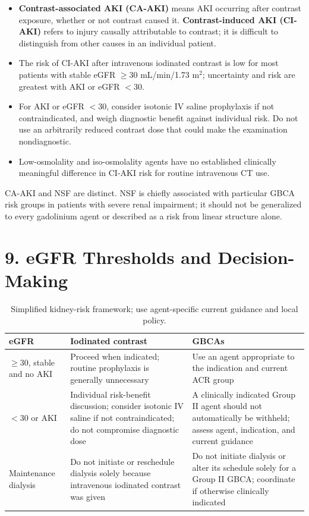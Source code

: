 \begin{itemize}
    \item \textbf{Contrast-associated AKI (CA-AKI)} means AKI occurring after contrast exposure, whether or not contrast caused it. \textbf{Contrast-induced AKI (CI-AKI)} refers to injury causally attributable to contrast; it is difficult to distinguish from other causes in an individual patient.
    \item The risk of CI-AKI after intravenous iodinated contrast is low for most patients with stable eGFR $\geq30$ mL/min/1.73 m$^2$; uncertainty and risk are greatest with AKI or eGFR $<30$.
    \item For AKI or eGFR $<30$, consider isotonic IV saline prophylaxis if not contraindicated, and weigh diagnostic benefit against individual risk. Do not use an arbitrarily reduced contrast dose that could make the examination nondiagnostic.
    \item Low-osmolality and iso-osmolality agents have no established clinically meaningful difference in CI-AKI risk for routine intravenous CT use.
\end{itemize}

\begin{pearlbox}
CA-AKI and NSF are distinct. NSF is chiefly associated with particular GBCA risk groups in patients with severe renal impairment; it should not be generalized to every gadolinium agent or described as a risk from linear structure alone.
\end{pearlbox}


\section*{9. eGFR Thresholds and Decision-Making}

\begin{table}[h]
\centering
\caption{Simplified kidney-risk framework; use agent-specific current guidance and local policy.}
\begin{tabular}{|p{}|p{}|p{}|}
\hline
\textbf{eGFR} & \textbf{Iodinated contrast} & \textbf{GBCAs} \\
\hline
$\geq$30, stable and no AKI & Proceed when indicated; routine prophylaxis is generally unnecessary & Use an agent appropriate to the indication and current ACR group \\
\hline
$<$30 or AKI & Individual risk-benefit discussion; consider isotonic IV saline if not contraindicated; do not compromise diagnostic dose & A clinically indicated Group II agent should not automatically be withheld; assess agent, indication, and current guidance \\
\hline
Maintenance dialysis & Do not initiate or reschedule dialysis solely because intravenous iodinated contrast was given & Do not initiate dialysis or alter its schedule solely for a Group II GBCA; coordinate if otherwise clinically indicated \\
\hline
\end{tabular}
\end{table}


